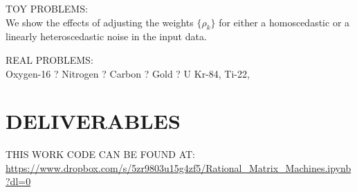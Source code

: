 \documentclass{article}
\begin{document}
TOY PROBLEMS:\\
We show the effects of adjusting the weights $\big\{ \rho_k \big\}$ for either a homoscedastic or a linearly heteroscedastic noise in the input data. 

REAL PROBLEMS:\\
Oxygen-16 ? Nitrogen ? Carbon ? Gold ? U Kr-84, Ti-22, 



















\section{\label{DELIVERABLES}DELIVERABLES}

THIS WORK CODE CAN BE FOUND AT: \url{https://www.dropbox.com/s/5zr9803u15g4zf5/Rational_Matrix_Machines.ipynb?dl=0}
\end{document}
